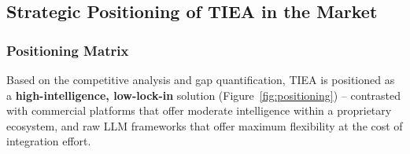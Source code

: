 \documentclass[12pt,a4paper]{report}
\begin{document}
\subsection{Strategic Positioning of TIEA in the Market}

\subsubsection{Positioning Matrix}

Based on the competitive analysis and gap quantification, TIEA is positioned as a
\textbf{high-intelligence, low-lock-in} solution (Figure~\ref{fig:positioning}) -- contrasted with
commercial platforms that offer moderate intelligence within a proprietary ecosystem, and raw LLM
frameworks that offer maximum flexibility at the cost of integration effort.
\end{document}

